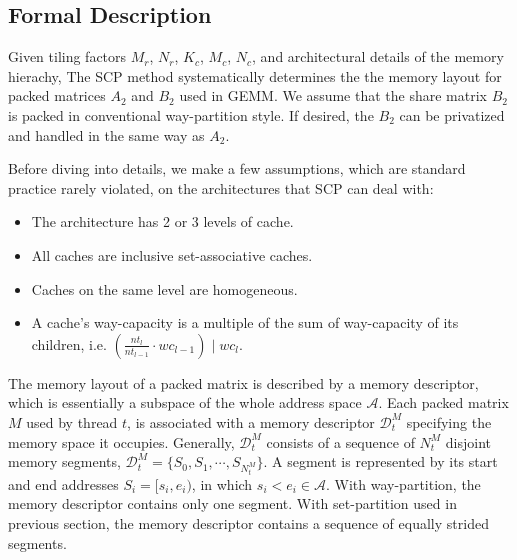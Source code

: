 \subsection{Formal Description}\label{subsec:formal}
Given tiling factors $M_r$, $N_r$, $K_c$, $M_c$, $N_c$,
and architectural details of the memory hierachy,
The SCP method systematically determines the
the memory layout for packed matrices $A_2$ and $B_2$ used in GEMM.
We assume that the share matrix $B_2$ is packed in conventional way-partition style.
If desired, the $B_2$ can be privatized and handled in the same way as $A_2$.

Before diving into details, we make a few assumptions,
which are standard practice rarely violated,
on the architectures that SCP can deal with:
\begin{itemize}
\item The architecture has 2 or 3 levels of cache. %
\item All caches are inclusive set-associative caches. %
\item Caches on the same level are homogeneous. %
\item A cache's way-capacity is a multiple of the sum of way-capacity of its children,
i.e. $(\frac{nt_l}{nt_{l-1}} \cdot wc_{l-1}) \mid wc_l$.
\end{itemize}

The memory layout of a packed matrix is described by a memory descriptor,
which is essentially a subspace of the whole address space $\mathcal{A}$.
Each packed matrix $M$ used by thread $t$,
is associated with a memory descriptor $\mathcal{D}_t^M$
specifying the memory space it occupies.
Generally, $\mathcal{D}_t^M$ consists of a sequence of $N_t^M$ disjoint memory segments,
$\mathcal{D}_t^M = \{ S_0, S_1, \cdots, S_{N_t^M}\}$.
A segment is represented by its start and end addresses $S_i = [s_i, e_i)$,
in which $s_i < e_i \in \mathcal{A}$.
With way-partition, the memory descriptor contains only one segment.
With set-partition used in previous section,
the memory descriptor contains a sequence of equally strided segments.

